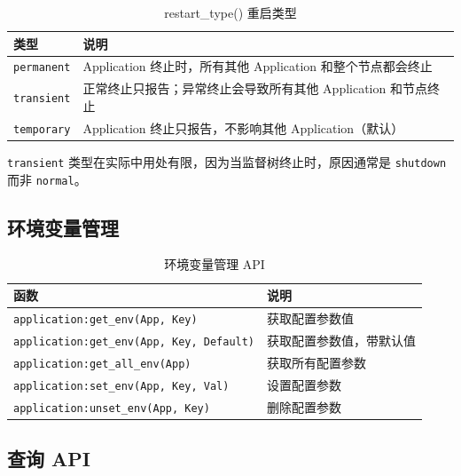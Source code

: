 \documentclass[a4paper,11pt]{article}
\begin{document}
\begin{table}[H]
\centering
\begin{tabular}{@{}lp{9cm}@{}}
\toprule
\textbf{类型} & \textbf{说明} \\
\midrule
\texttt{permanent} & Application 终止时，所有其他 Application 和整个节点都会终止 \\
\texttt{transient} & 正常终止只报告；异常终止会导致所有其他 Application 和节点终止 \\
\texttt{temporary} & Application 终止只报告，不影响其他 Application（默认） \\
\bottomrule
\end{tabular}
\caption{restart\_type() 重启类型}
\end{table}

\begin{warnbox}[注意]
\texttt{transient} 类型在实际中用处有限，因为当监督树终止时，原因通常是 \texttt{shutdown} 而非 \texttt{normal}。
\end{warnbox}

\subsection{环境变量管理}

\begin{table}[H]
\centering
\begin{tabular}{@{}lp{7cm}@{}}
\toprule
\textbf{函数} & \textbf{说明} \\
\midrule
\texttt{application:get\_env(App, Key)} & 获取配置参数值 \\
\texttt{application:get\_env(App, Key, Default)} & 获取配置参数值，带默认值 \\
\texttt{application:get\_all\_env(App)} & 获取所有配置参数 \\
\texttt{application:set\_env(App, Key, Val)} & 设置配置参数 \\
\texttt{application:unset\_env(App, Key)} & 删除配置参数 \\
\bottomrule
\end{tabular}
\caption{环境变量管理 API}
\end{table}

\subsection{查询 API}
\end{document}
